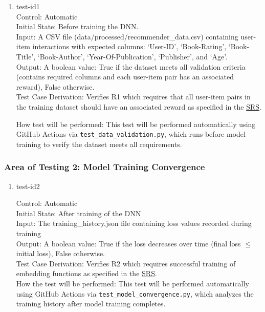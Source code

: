 \documentclass[12pt, titlepage]{article}
\begin{document}
\begin{enumerate}

  \item{test-id1\\}
  Control: Automatic\\
  Initial State: Before training the DNN.\\
  Input: A CSV file (data/processed/recommender\_data.csv) containing user-item interactions with expected columns: `User-ID', `Book-Rating', `Book-Title', `Book-Author', `Year-Of-Publication', `Publisher', and `Age'.\\
  Output: A boolean value: True if the dataset meets all validation criteria (contains required columns and each user-item pair has an associated reward), False otherwise.\\
  Test Case Derivation: Verifies R1 which requires that all user-item pairs in the training dataset should have an associated reward as specified in the \href{https://github.com/V-AS/Two-tower-recommender-system/blob/main/docs/SRS/SRS.pdf}{SRS}.

  How test will be performed: This test will be performed automatically using GitHub Actions via \texttt{test\_data\_validation.py}, which runs before model training to verify the dataset meets all requirements.
					
\end{enumerate}


\subsubsection{Area of Testing 2: Model Training Convergence}

\begin{enumerate}
  \item{test-id2\\}

  Control: Automatic\\
  Initial State: After training of the DNN\\
  Input: The training\_history.json file containing loss values recorded during training\\
  Output: A boolean value: True if the loss decreases over time (final loss $\leq$ initial loss), False otherwise.\\
  Test Case Derivation: Verifies R2 which requires successful training of embedding functions as specified in the \href{https://github.com/V-AS/Two-tower-recommender-system/blob/main/docs/SRS/SRS.pdf}{SRS}.\\
  How the test will be performed: This test will be performed automatically using GitHub Actions via \texttt{test\_model\_convergence.py}, which analyzes the training history after model training completes.

\end{enumerate}
\end{document}
